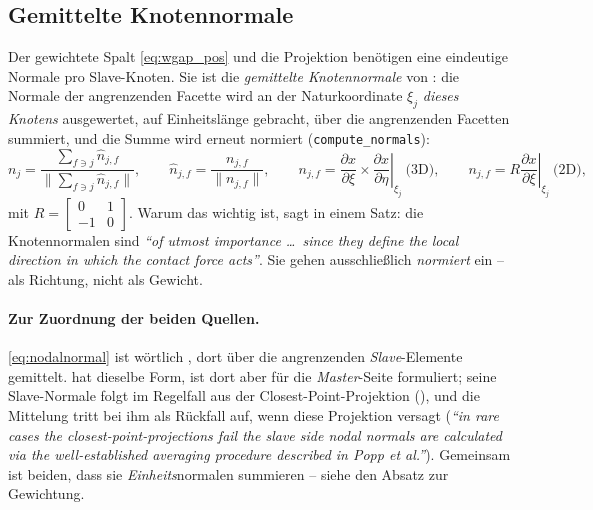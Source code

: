\documentclass[a4paper,11pt]{article}
\def\bm#1{#1}%
\newcommand{\code}[1]{\texttt{\small #1}}
\begin{document}
\subsection{Gemittelte Knotennormale}
\label{sec:knotennormale}
Der gewichtete Spalt \eqref{eq:wgap_pos} und die Projektion benötigen eine eindeutige Normale pro
Slave-Knoten. Sie ist die \emph{gemittelte Knotennormale} von \citet[Gl.~(37)]{popp2010}: die
Normale der angrenzenden Facette wird an der Naturkoordinate $\bm\xi_j$ \emph{dieses Knotens}
ausgewertet, auf Einheitslänge gebracht, über die angrenzenden Facetten summiert, und die Summe
wird erneut normiert (\code{compute\_normals}):
\begin{equation}
\bm n_j = \frac{\sum_{f\ni j}\hat{\bm n}_{j,f}}{\big\|\sum_{f\ni j}\hat{\bm n}_{j,f}\big\|},
\qquad
\hat{\bm n}_{j,f} = \frac{\bm n_{j,f}}{\|\bm n_{j,f}\|},
\qquad
\bm n_{j,f} =
\left.\frac{\partial\bm x}{\partial\xi}\times\frac{\partial\bm x}{\partial\eta}\right|_{\bm\xi_j}
\ \text{(3D)},
\qquad
\bm n_{j,f} = \bm R\left.\frac{\partial\bm x}{\partial\xi}\right|_{\xi_j}
\ \text{(2D)},
\label{eq:nodalnormal}
\end{equation}
mit $\bm R=\left[\begin{smallmatrix}0&1\\-1&0\end{smallmatrix}\right]$. Warum das wichtig ist,
sagt \citet[Abschn.~4.4]{farah} in einem Satz: die Knotennormalen sind
\emph{``of utmost importance \dots\ since they define the local direction in which the contact
force acts''}. Sie gehen ausschließlich \emph{normiert} ein -- als Richtung, nicht als Gewicht.

\paragraph{Zur Zuordnung der beiden Quellen.} \eqref{eq:nodalnormal} ist wörtlich
\citet[Gl.~(37)]{popp2010}, dort über die angrenzenden \emph{Slave}-Elemente gemittelt.
\citet[Gl.~(4.41)]{farah} hat dieselbe Form, ist dort aber für die \emph{Master}-Seite
formuliert; seine Slave-Normale folgt im Regelfall aus der Closest-Point-Projektion
(\citealp[Gl.~(4.42)]{farah}), und die Mittelung tritt bei ihm als Rückfall auf, wenn diese
Projektion versagt (\emph{``in rare cases the closest-point-projections fail the slave side nodal
normals are calculated via the well-established averaging procedure described in Popp et al.''}).
Gemeinsam ist beiden, dass sie \emph{Einheits}normalen summieren -- siehe den Absatz zur
Gewichtung.
\end{document}
